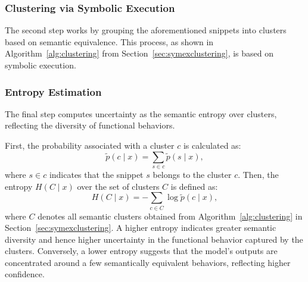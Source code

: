 \subsubsection{Clustering via Symbolic Execution}
The second step works by grouping the aforementioned snippets into clusters based on semantic equivalence. %
%
This process, as shown in Algorithm~\ref{alg:clustering} from Section~\ref{sec:symexclustering}, is based on symbolic execution. %

\subsubsection{Entropy Estimation}
The final step computes uncertainty as the semantic entropy over clusters, reflecting the diversity of functional behaviors.

%
First, the probability associated with a cluster \(c\) is calculated as:
\begin{equation*}
    \tilde{p}(c \mid x) = \sum_{s \in c} \tilde{p}(s \mid x),
\end{equation*}
where \(s \in c\) indicates that the snippet \(s\) belongs to the cluster \(c\).
%
Then, the entropy \(H(C \mid x)\) over the set of clusters \(C\) is defined as:
\begin{equation*}
    H(C \mid x) = -\sum_{c \in C} \log \tilde{p}(c \mid x),
\end{equation*}
where \(C\) denotes all semantic clusters obtained from Algorithm~\ref{alg:clustering} in Section~\ref{sec:symexclustering}. 
%
A higher entropy indicates greater semantic diversity and hence higher uncertainty in the functional behavior captured by the clusters. 
Conversely, a lower entropy suggests that the model's outputs are concentrated around a few semantically equivalent behaviors, reflecting higher confidence.

